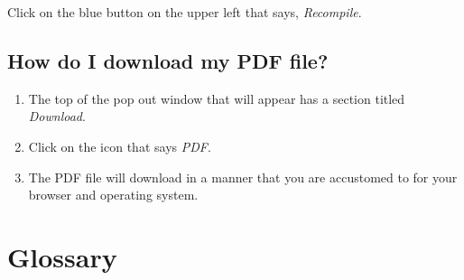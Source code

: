 \documentclass[]{memoir}
\begin{document}
Click on the blue button on the upper left that says, \emph{Recompile}.

\section{How do I download my PDF file?}
\begin{enumerate}
\item The top of the pop out window that will appear has a section titled \emph{Download}.
\item Click on the icon that says \emph{PDF}.
\item The PDF file will download in a manner that you are accustomed to for your browser and operating system.
\end{enumerate}

\vfill



\fancyhead[L]{\textsf{\rightmark}} %
\fancyhead[R]{\textsf{\leftmark}} %
\renewcommand{\headrulewidth}{1.4pt} %
\fancyfoot[C]{\textbf{\textsf{\thepage}}} %
\renewcommand{\footrulewidth}{1.4pt} %
\pagestyle{fancy} %

\newcommand{\entry}[4]{\markboth{#1}{#1}\textbf{#1}\ {(#2)}\ \textit{#3}\ $\bullet$\ {#4}}  %

\setlength{\parskip}{5pt}\chapter{Glossary}
\end{document}
